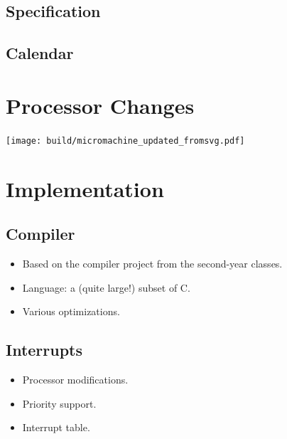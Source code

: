 \documentclass{beamer}
\begin{document}
    \subsection{Specification}

    \subsection{Calendar}

  \section{Processor Changes}
    \begin{landscape}
        \begin{frame}
            \texttt{[image: build/micromachine\_updated\_fromsvg.pdf]}

        \end{frame}
    \end{landscape}
  \section{Implementation}

    \subsection{Compiler}

    \begin{frame}
      \begin{itemize}
        \item Based on the compiler project from the second-year classes.
        \item Language: a (quite large!) subset of C.
        \item Various optimizations.
      \end{itemize}
    \end{frame}

    \subsection{Interrupts}

    \begin{frame}
      \begin{itemize}
        \item Processor modifications.
        \item Priority support.
        \item Interrupt table.
      \end{itemize}
    \end{frame}
\end{document}
